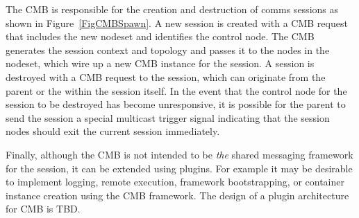 The CMB is responsible for the creation and destruction of
comms sessions as shown in Figure~\ref{FigCMBSpawn}.
A new session is created with a CMB request that
includes the new nodeset and identifies the control node.  The CMB
generates the session context and topology and passes it to the nodes
in the nodeset, which wire up a new CMB instance for the session.
A session is destroyed with a CMB request to the session,
which can originate from the parent or the within the session itself.
In the event that the control node for the session to be destroyed has become
unresponsive, it is possible for the parent to send the session a
special multicast trigger signal indicating that the session nodes
should exit the current session immediately.

Finally, although the CMB is not intended to be {\em the} shared messaging
framework for the session, it can be extended using plugins.
For example it may be desirable to implement logging, remote execution,
framework bootstrapping, or container instance creation using the
CMB framework.  The design of a plugin architecture for CMB is TBD.
